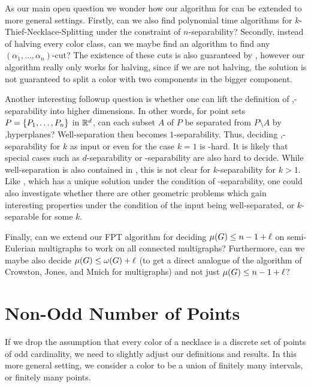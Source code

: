 \documentclass[a4paper,UKenglish,cleveref, thm-restate]{lipics-v2021}
\begin{document}
As our main open question we wonder how our algorithm for \TwoThiefNecklaceSplitting can be extended to more general settings. Firstly, can we also find polynomial time algorithms for $k$-Thief-Necklace-Splitting under the constraint of $n$-separability? Secondly, instead of halving every color class, can we maybe find an algorithm to find any $(\alpha_1,\ldots,\alpha_n)$-cut? The existence of these cuts is also guaranteed by , however our algorithm really only works for halving, since if we are not halving, the solution is not guaranteed to split a color with two components in the bigger component. 

Another interesting followup question is whether one can lift the definition of \sep-separability into higher dimensions. In other words, for \dimension point sets $P = \{P_1, \dots, P_\dimension\}$ in $\mathbb{R}^d$, can each subset $A$ of $P$ be separated from $P\setminus A$ by \sep hyperplanes?
Well-separation then becomes $1$-separability. 
Thus, deciding \sep-separability for $k$ as input or even for the case $k=1$ is \coNP-hard. It is likely that special cases such as  $d$-separability or \dimension-separability are also hard to decide. While well-separation is also contained in \coNP, this is not clear for $k$-separability for $k>1$.
Like \TwoThiefNecklaceSplitting, which has a unique solution under the condition of \dimension-separability, one could also investigate whether there are other geometric problems which gain interesting properties under the condition of the input being well-separated, or $k$-separable for some $k$.

Finally, can we extend our FPT algorithm for deciding $\mu(G)\leq \dimension-1+\constB$ on semi-Eulerian multigraphs to work on all connected multigraphs? Furthermore, can we maybe also decide $\mu(G)\leq \bound(G)+\constB$ (to get a direct analogue of the algorithm of Crowston, Jones, and Mnich for multigraphs) and not just $\mu(G)\leq n-1+\constB$?

\clearpage


\newpage
\appendix
\section{Non-Odd Number of Points}\label{app:non-odd}
If we drop the assumption that every color of a necklace is a discrete set of points of odd cardinality, we need to slightly adjust our definitions and results. In this more general setting, we consider a color to be a union of finitely many intervals, or finitely many points.
\end{document}
